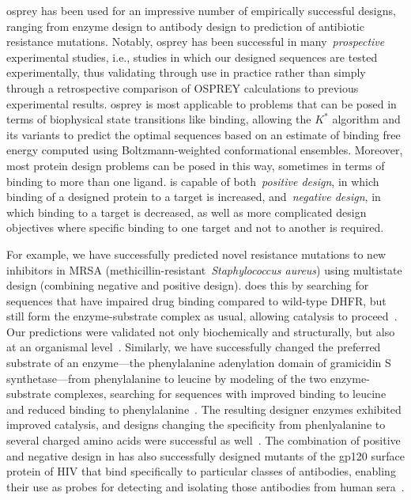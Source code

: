 
{\sc osprey} has been used for an impressive number of empirically successful designs, ranging from enzyme design to antibody design to prediction of antibiotic resistance mutations.  Notably, {\sc osprey} has been successful in many~\textit{prospective} experimental studies, i.e., studies in which our designed sequences are tested experimentally, thus validating \osprey through use in practice rather than simply through a retrospective comparison of OSPREY calculations to previous experimental results.  {\sc osprey} is most applicable to problems that can be posed in terms of biophysical state transitions like binding, allowing the $K^*$ algorithm and its variants to predict the optimal sequences based on an estimate of binding free energy computed using Boltzmann-weighted conformational ensembles.  Moreover, most protein design problems can be posed in this way, sometimes in terms of binding to more than one ligand.  \osprey is capable of both~\textit{positive design}, in which binding of a designed protein to a target is increased, and~\textit{negative design}, in which binding to a target is decreased, as well as more complicated design objectives where specific binding to one target and not to another is required.  

For example, we have successfully predicted novel resistance mutations to new inhibitors in MRSA (methicillin-resistant~\textit{Staphylococcus aureus}) using multistate design (combining negative and positive design).  \osprey does this by searching for sequences that have impaired drug binding compared to wild-type DHFR, but still form the enzyme-substrate complex as usual, allowing catalysis to proceed~\cite{DHFR-PNAS,DHFR-PNAS2}.  Our predictions were validated not only biochemically and structurally, but also at an organismal level~\cite{DHFR-PNAS2, mimb_resistance}.  Similarly, we have successfully changed the preferred substrate of an enzyme---the phenylalanine adenylation domain of gramicidin S synthetase---from phenylalanine to leucine by modeling of the two enzyme-substrate complexes, searching for sequences with improved binding to leucine and reduced binding to phenylalanine~\cite{GrsA-LeuA}.  The resulting designer enzymes exhibited improved catalysis, and designs changing the specificity from phenlyalanine to several charged amino acids were successful as well~\cite{GrsA-LeuA}.  The combination of positive and negative design in \osprey has also successfully designed mutants of the gp120 surface protein of HIV that bind specifically to particular classes of antibodies, enabling their use as probes for detecting and isolating those antibodies from human sera~\cite{specific_probes}.  

